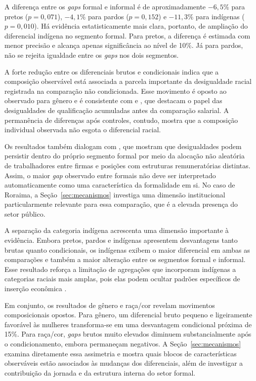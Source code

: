 \documentclass[12pt]{article}
\begin{document}
A diferença entre os \textit{gaps} formal e informal é de aproximadamente $-6,5\%$
para pretos ($p=0,071$), $-4,1\%$ para pardos ($p=0,152$) e $-11,3\%$ para
indígenas ($p=0,010$). Há evidência estatisticamente mais clara, portanto, de
ampliação do diferencial indígena no segmento formal. Para pretos, a diferença
é estimada com menor precisão e alcança apenas significância ao nível de 10\%. Já 
para pardos, não se rejeita igualdade entre os \textit{gaps} nos dois segmentos.

A forte redução entre os diferenciais brutos e condicionais indica que a
composição observável está associada a parcela importante da desigualdade
racial registrada na comparação não condicionada. Esse movimento é oposto ao
observado para gênero e é consistente com \citet{soares2000} e
\citet{campante2004}, que destacam o papel das desigualdades de qualificação acumuladas antes
da comparação salarial. A permanência de diferenças após controles, contudo,
mostra que a composição individual observada não esgota o diferencial racial.

Os resultados também dialogam com \citet{gerard2021}, que mostram que
desigualdades podem persistir dentro do próprio segmento formal por meio da
alocação não aleatória de trabalhadores entre firmas e posições com estruturas
remuneratórias distintas. Assim, o maior \textit{gap} observado entre formais não deve
ser interpretado automaticamente como uma característica da formalidade em si.
No caso de Roraima, a Seção~\ref{sec:mecanismos} investiga uma dimensão
institucional particularmente relevante para essa comparação,  que é a elevada
presença do setor público.

A separação da categoria indígena acrescenta uma dimensão importante à
evidência. Embora pretos, pardos e indígenas apresentem desvantagens tanto
brutas quanto condicionais, os indígenas exibem o maior diferencial em ambas
as comparações e também a maior alteração entre os segmentos formal e informal.
Esse resultado reforça a limitação de agregações que incorporam indígenas a
categorias raciais mais amplas, pois elas podem ocultar padrões específicos de
inserção econômica \citep{canelas2014, canedo2019, kolev2015}.

Em conjunto, os resultados de gênero e raça/cor revelam movimentos
composicionais opostos. Para gênero, um diferencial bruto pequeno e ligeiramente
favorável às mulheres transforma-se em uma desvantagem condicional próxima de
15\%. Para raça/cor, \textit{gaps} brutos muito elevados diminuem substancialmente após
o condicionamento, embora permaneçam negativos. A
Seção~\ref{sec:mecanismos} examina diretamente essa assimetria e mostra quais
blocos de características observáveis estão associados às mudanças dos
diferenciais, além de investigar a contribuição da jornada e da estrutura
interna do setor formal.
\end{document}
